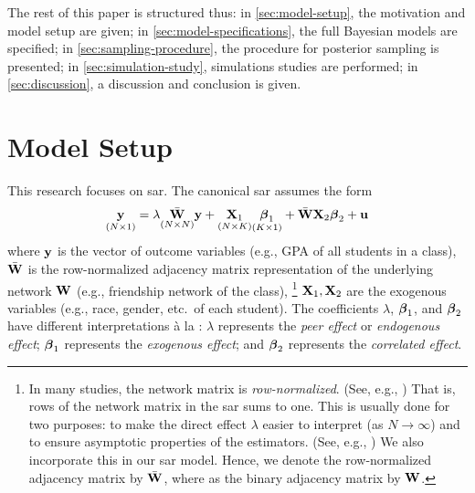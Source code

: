 \documentclass[a4paper]{article}
\begin{document}
The rest of this paper is structured thus:
in \autoref{sec:model-setup}, the motivation and model setup are given;
in \autoref{sec:model-specifications}, the full Bayesian models are specified;
in \autoref{sec:sampling-procedure}, the procedure for posterior sampling is presented;
in \autoref{sec:simulation-study}, simulations studies are performed;
in \autoref{sec:discussion}, a discussion and conclusion is given.

\section{Model Setup}\label{sec:model-setup}

This research focuses on \gls{sar}.
The canonical \gls{sar} assumes the form
\begin{align}\label{eq:sar}
	\underset{(N\times 1)}{\mathbf{y}}
	= \lambda\underset{(N\times N)}{\bar{\mathbf{W}}}\mathbf{y}
	+ \underset{(N\times K)}{\mathbf{X}_{1}}\underset{(K\times 1)}{\boldsymbol{\beta}_1}
	+ \bar{\mathbf{W}}\mathbf{X}_{2}\boldsymbol{\beta}_2
	+ \mathbf{u}
\end{align}
where $\mathbf{y}$ is the vector of outcome variables (e.g., GPA of all students in a class),
$\bar{\mathbf{W}}$ is the row-normalized adjacency matrix representation of the underlying network $\mathbf{W}$ (e.g., friendship network of the class),
\footnote{
	In many studies, the network matrix is \emph{row-normalized}. (See, e.g., \cite{lesage-pace-2009})
	That is, rows of the network matrix in the \gls{sar} sums to one.
	This is usually done for two purposes:
	to make the direct effect $\lambda$ easier to interpret (as $N\to\infty$) and
	to ensure asymptotic properties of the estimators. (See, e.g., \cite{lee-2003})
	We also incorporate this in our \gls{sar} model.
	Hence, we denote the row-normalized adjacency matrix by $\bar{\mathbf{W}}$,
	where as the binary adjacency matrix by $\mathbf{W}$.
}
$\mathbf{X}_{1},\mathbf{X}_{2}$ are the exogenous variables (e.g., race, gender, etc.\ of each student).
The coefficients $\lambda$, $\boldsymbol{\beta}_1$, and $\boldsymbol{\beta}_2$ have different interpretations \`a la \cite{manski-1993}:
$\lambda$ represents the \emph{peer effect} or \emph{endogenous effect};
$\boldsymbol{\beta}_1$ represents the \emph{exogenous effect};
and $\boldsymbol{\beta}_2$ represents the \emph{correlated effect}.
\end{document}

